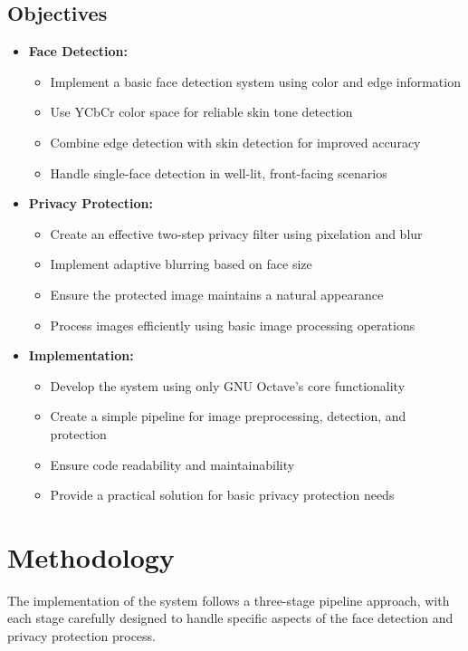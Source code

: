 \documentclass[12pt,a4paper]{article}
\begin{document}
\subsection{Objectives}
\begin{itemize}
    \item \textbf{Face Detection:}
    \begin{itemize}
        \item Implement a basic face detection system using color and edge information
        \item Use YCbCr color space for reliable skin tone detection
        \item Combine edge detection with skin detection for improved accuracy
        \item Handle single-face detection in well-lit, front-facing scenarios
    \end{itemize}
    
    \item \textbf{Privacy Protection:}
    \begin{itemize}
        \item Create an effective two-step privacy filter using pixelation and blur
        \item Implement adaptive blurring based on face size
        \item Ensure the protected image maintains a natural appearance
        \item Process images efficiently using basic image processing operations
    \end{itemize}
    
    \item \textbf{Implementation:}
    \begin{itemize}
        \item Develop the system using only GNU Octave's core functionality
        \item Create a simple pipeline for image preprocessing, detection, and protection
        \item Ensure code readability and maintainability
        \item Provide a practical solution for basic privacy protection needs
    \end{itemize}
\end{itemize}

\section{Methodology}
The implementation of the system follows a three-stage pipeline approach, with each stage carefully designed to handle specific aspects of the face detection and privacy protection process.
\end{document}
